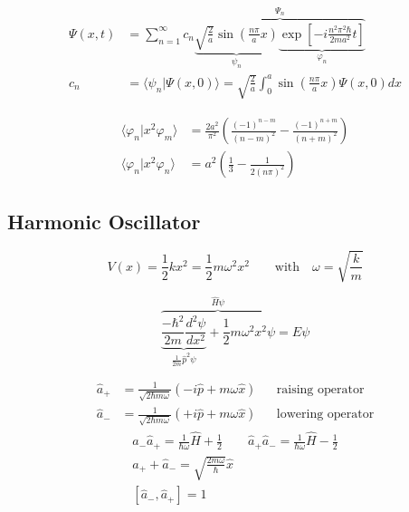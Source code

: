 \noindent\begin{align*}
    \Psi(x,t) & =\sum_{n=1}^{\infty}c_{n} \overbrace{\underbrace{\sqrt{\frac{2}{a}}\sin\left(\frac{n\pi}{a}x\right)}_{\psi_n} \underbrace{\exp\left[-i\frac{n^{2}\pi^{2}\hbar}{2ma^{2}}t\right]}_{\varphi_n}}^{\Psi_n} \\
    c_n       & =\langle \psi_n|\Psi(x,0)\rangle = \sqrt{\frac{2}{a}}\int_0^a\sin\left(\frac{n\pi}{a}x\right)\Psi(x,0)dx
\end{align*}

\noindent\begin{align*}
    \langle \varphi_n|x^2\varphi_m\rangle & = \frac{2a^2}{\pi^2}\left(\frac{{(-1)}^{n-m}}{{(n-m)}^2}-\frac{{(-1)}^{n+m}}{{(n+m)}^2}\right) \\
    \langle \varphi_n|x^2\varphi_n\rangle & = a^2\left(\frac{1}{3} -\frac{1}{2{(n\pi)}^2}\right)
\end{align*}

\subsection{Harmonic Oscillator}
\begin{equation*}
    V(x) = \frac{1}{2}k x^2 = \frac{1}{2}m \omega^2 x^2 \qquad \text{with} \quad \omega = \sqrt{\frac{k}{m}}
\end{equation*}

\noindent\begin{equation*}
    \overbrace{\underbrace{\frac{-\hbar^2}{2m}\frac{d^2\psi}{dx^2}}_{\frac{1}{2m}\hat{p}^2\psi} + \frac{1}{2}m \omega^2 x^2 \psi}^{\widehat{H}\psi}  = E\psi
\end{equation*}

\begin{align*}
    \widehat{a}_{+} & = \frac{1}{\sqrt{2\hbar m \omega}}\left(-i\widehat{p}+m\omega\widehat{x}\right) &  & \text{raising operator}  \\
    \widehat{a}_{-} & = \frac{1}{\sqrt{2\hbar m \omega}}\left(+i\widehat{p}+m\omega\widehat{x}\right) &  & \text{lowering operator}
\end{align*}
\noindent\begin{gather*}
    \widehat{a}_{-}\widehat{a}_{+}=\frac{1}{\hbar\omega}\widehat{H}+\frac{1}{2} \quad\quad \widehat{a}_{+}\widehat{a}_{-}=\frac{1}{\hbar\omega}\widehat{H}-\frac{1}{2} \\
    \widehat{a}_{+} + \widehat{a}_{-} = \sqrt{\frac{2m\omega}{\hbar}} \widehat{x} \\
    \left[\widehat{a}_{-},\widehat{a}_{+}\right] = 1
\end{gather*}


